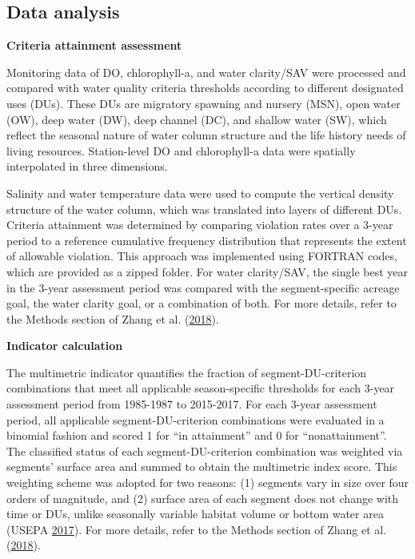 \documentclass[
]{book}
\begin{document}
\hypertarget{data-analysis-6}{%
\subsection{Data analysis}\label{data-analysis-6}}

\textbf{Criteria attainment assessment}

Monitoring data of DO, chlorophyll-a, and water clarity/SAV were processed and compared with water quality criteria thresholds according to different designated uses (DUs). These DUs are migratory spawning and nursery (MSN), open water (OW), deep water (DW), deep channel (DC), and shallow water (SW), which reflect the seasonal nature of water column structure and the life history needs of living resources. Station-level DO and chlorophyll-a data were spatially interpolated in three dimensions.

Salinity and water temperature data were used to compute the vertical density structure of the water column, which was translated into layers of different DUs. Criteria attainment was determined by comparing violation rates over a 3-year period to a reference cumulative frequency distribution that represents the extent of allowable violation. This approach was implemented using FORTRAN codes, which are provided as a zipped folder. For water clarity/SAV, the single best year in the 3-year assessment period was compared with the segment-specific acreage goal, the water clarity goal, or a combination of both. For more details, refer to the Methods section of Zhang et al. (\protect\hyperlink{ref-zhang2018}{2018}).

\textbf{Indicator calculation}

The multimetric indicator quantifies the fraction of segment-DU-criterion combinations that meet all applicable season-specific thresholds for each 3-year assessment period from 1985-1987 to 2015-2017. For each 3-year assessment period, all applicable segment-DU-criterion combinations were evaluated in a binomial fashion and scored 1 for ``in attainment'' and 0 for ``nonattainment''. The classified status of each segment-DU-criterion combination was weighted via segments' surface area and summed to obtain the multimetric index score. This weighting scheme was adopted for two reasons: (1) segments vary in size over four orders of magnitude, and (2) surface area of each segment does not change with time or DUs, unlike seasonally variable habitat volume or bottom water area (USEPA \protect\hyperlink{ref-usepa2017}{2017}). For more details, refer to the Methods section of Zhang et al. (\protect\hyperlink{ref-zhang2018}{2018}).
\end{document}

